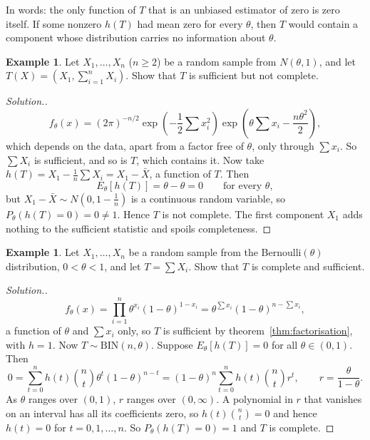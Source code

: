\documentclass[12pt,a4paper]{report}
\theoremstyle{definition}
\newtheorem{exa}[thm]{Example}
\newenvironment{solution}
  {\renewcommand{\qedsymbol}{}\begin{proof}[\textit{Solution}.]}
  {\end{proof}}
\begin{document}
In words: the only function of $T$ that is an unbiased estimator of zero is zero
itself. If some nonzero $h(T)$ had mean zero for every $\theta$, then $T$ would
contain a component whose distribution carries no information about $\theta$.

\begin{exa}
\label{ex:notcomplete}
Let $X_1, \dots, X_n$ ($n\ge 2$) be a random sample from $N(\theta, 1)$, and let
$T(X) = \left(X_1, \sum_{i=1}^n X_i\right)$. Show that $T$ is sufficient but not
complete.
\end{exa}

\begin{solution}
\[f_\theta(x) = (2\pi)^{-n/2}\exp\left(-\frac12\sum x_i^2\right)\exp\left(\theta\sum x_i - \frac{n\theta^2}{2}\right),\]
which depends on the data, apart from a factor free of $\theta$, only through
$\sum x_i$. So $\sum X_i$ is sufficient, and so is $T$, which contains it. Now take
$h(T) = X_1 - \frac1n\sum X_i = X_1 - \bar X$, a function of $T$. Then
\[E_\theta\left[h(T)\right] = \theta - \theta = 0\qquad\text{for every } \theta ,\]
but $X_1 - \bar X\sim N\left(0, 1 - \frac1n\right)$ is a continuous random
variable, so $P_\theta(h(T) = 0) = 0\ne 1$. Hence $T$ is not complete. The first
component $X_1$ adds nothing to the sufficient statistic and spoils completeness.
\end{solution}

\begin{exa}
\label{ex:bernoullicomplete}
Let $X_1, \dots, X_n$ be a random sample from the Bernoulli$(\theta)$ distribution,
$0<\theta<1$, and let $T = \sum X_i$. Show that $T$ is complete and sufficient.
\end{exa}

\begin{solution}
\[f_\theta(x) = \prod^n_{i = 1}\theta^{x_i}(1 - \theta)^{1 - x_i}
= \theta^{\sum x_i}(1 - \theta)^{n - \sum x_i},\]
a function of $\theta$ and $\sum x_i$ only, so $T$ is sufficient by
theorem~\ref{thm:factorisation}, with $h = 1$. Now $T\sim\text{BIN}(n, \theta)$.
Suppose $E_\theta\left[h(T)\right] = 0$ for all $\theta\in(0, 1)$. Then
\[0 = \sum^n_{t = 0} h(t)\binom{n}{t}\theta^t(1 - \theta)^{n - t}
= (1 - \theta)^n\sum^n_{t = 0} h(t)\binom{n}{t} r^t,\qquad r = \frac{\theta}{1 - \theta} .\]
As $\theta$ ranges over $(0, 1)$, $r$ ranges over $(0, \infty)$. A polynomial in $r$
that vanishes on an interval has all its coefficients zero, so
$h(t)\binom nt = 0$ and hence $h(t) = 0$ for $t = 0, 1, \dots, n$. So
$P_\theta(h(T) = 0) = 1$ and $T$ is complete.
\end{solution}
\end{document}

